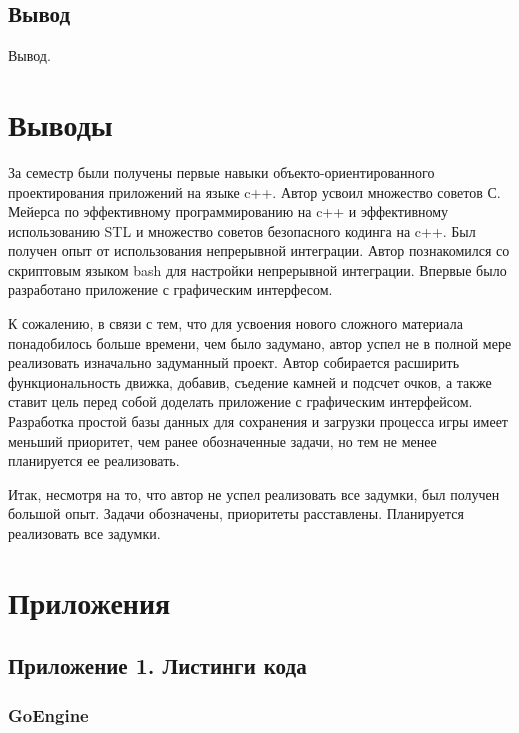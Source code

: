 \subsection*{Вывод}

Вывод.

\section*{Выводы}

За семестр были получены первые навыки объекто-ориентированного проектирования приложений на языке c++. Автор усвоил множество советов С. Мейерса по эффективному программированию на c++ и эффективному использованию STL и множество советов безопасного кодинга на c++. Был получен опыт от использования непрерывной интеграции. Автор познакомился со скриптовым языком bash для настройки непрерывной интеграции. Впервые было разработано приложение с графическим интерфесом.

К сожалению, в связи с тем, что для усвоения нового сложного материала понадобилось больше времени, чем было задумано, автор успел не в полной мере реализовать изначально задуманный проект. Автор собирается расширить функциональность движка, добавив, съедение камней и подсчет очков, а также ставит цель перед собой доделать приложение с графическим интерфейсом. Разработка простой базы данных для сохранения и загрузки процесса игры имеет меньший приоритет, чем ранее обозначенные задачи, но тем не менее планируется ее реализовать.

Итак, несмотря на то, что автор не успел реализовать все задумки, был получен большой опыт. Задачи обозначены, приоритеты расставлены. Планируется реализовать все задумки.


\section*{Приложения}

\subsection*{Приложение 1. Листинги кода}

\subsubsection*{GoEngine}

